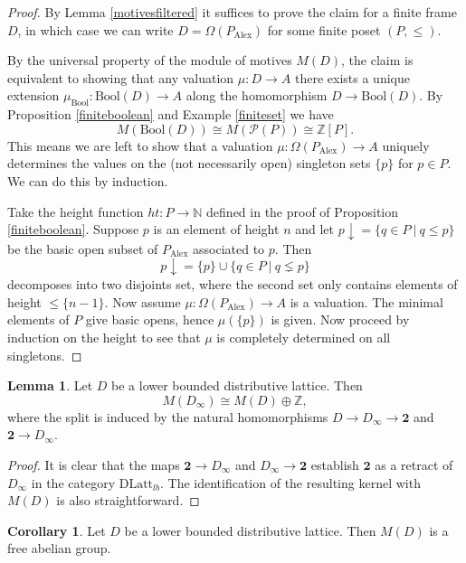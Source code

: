 \documentclass[10pt]{amsart}
\theoremstyle{definition}
\newtheorem{lemma}[theorem]{Lemma}
\newtheorem{corollary}[theorem]{Corollary}
\begin{document}
\begin{proof}
By Lemma \ref{motivesfiltered} it suffices to prove the claim for a finite frame $D$, in which case we can write $D = \Omega(P_{\mathrm{Alex}})$ for some finite poset $(P,\leq)$.

By the universal property of the module of motives $M(D)$, the claim is equivalent to showing that any valuation $\mu : D \rightarrow A$ there exists a unique extension $\mu_{\mathrm{Bool}} : \mathrm{Bool}(D) \rightarrow A$ along the homomorphism $D \rightarrow \mathrm{Bool}(D)$. By Proposition \ref{finiteboolean} and Example \ref{finiteset} we have
$$M( \mathrm{Bool}(D) ) \cong M( \mathcal{P}(P)) \cong \mathbb{Z}[P].$$
This means we are left to show that a valuation $\mu: \Omega(P_{\mathrm{Alex}}) \rightarrow A$ uniquely determines the values on the (not necessarily open) singleton sets $\{p\}$ for $p \in P$. We can do this by induction.

Take the height function $ht : P \rightarrow \mathbb{N}$ defined in the proof of Proposition \ref{finiteboolean}. Suppose $p$ is an element of height $n$ and let $p \downarrow = \{ q \in P ~|~ q \leq p \}$ be the basic open subset of $P_{\mathrm{Alex}}$ associated to $p$. Then
$$ p \downarrow = \{p\} \cup \{ q \in P ~|~ q \lneq p \}$$
decomposes into two disjoints set, where the second set only contains elements of height $\leq \{n-1\}$. Now assume $\mu: \Omega(P_{\mathrm{Alex}}) \rightarrow A$  is a valuation. The minimal elements of $P$ give basic opens, hence $\mu(\{p\})$ is given. Now proceed by induction on the height to see that $\mu$ is completely determined on all singletons.
\end{proof}

\begin{lemma} \label{splitofmot}
Let $D$ be a lower bounded distributive lattice. Then
$$M(D_{\infty}) \cong M(D) \oplus \mathbb{Z},$$
where the split is induced by the natural homomorphisms $D \rightarrow D_\infty \rightarrow \mathbf{2}$ and $\mathbf{2} \rightarrow D_\infty$.
\end{lemma}

\begin{proof}
It is clear that the maps $\mathbf{2} \rightarrow D_\infty$ and $D_\infty \rightarrow \mathbf{2}$ establish $\mathbf{2}$ as a retract of $D_\infty$ in the category $\mathrm{DLatt}_{lb}$. The identification of the resulting kernel with $M(D)$ is also straightforward.
\end{proof}

\begin{corollary} \label{motivesisfree}
Let $D$ be a lower bounded distributive lattice. Then $M(D)$ is a free abelian group.
\end{corollary}
\end{document}
